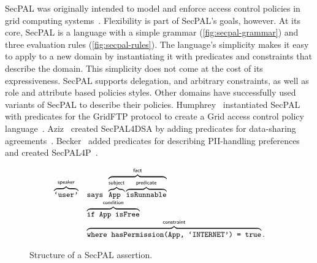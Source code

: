 \documentclass[thesis.tex]{subfiles}
\begin{document}
SecPAL was originally intended to model and enforce access control policies
    in grid computing systems~\cite{becker_secpal:_2010}. Flexibility is part of
    SecPAL's goals, however. At its core, SecPAL is a language with a simple grammar
    (\autoref{fig:secpal-grammar}) and three evaluation rules
    (\autoref{fig:secpal-rules}). The language's simplicity makes it easy to apply
    to a new domain by instantiating it with predicates and constraints that
    describe the domain. This simplicity does not come at the cost of its
    expressiveness. SecPAL supports delegation, and arbitrary constraints, as well
    as role and attribute based policies styles. Other domains have successfully
    used variants of SecPAL to describe their policies. Humphrey~\etal{} instantiated
    SecPAL with predicates for the GridFTP protocol to create a Grid access control
    policy language~\cite{humphrey_fine-grained_2007}. Aziz~\etal{} created SecPAL4DSA
    by adding predicates for data-sharing agreements~\cite{aziz_secpal4dsa:_2011}.
    Becker~\etal{} added predicates for describing \ac{PII}-handling preferences and
    created SecPAL4P~\cite{becker_framework_2009}.

\begin{figure}
  \newcommand{\bracetext}[1]{\text{\sffamily #1}}
  \newcommand{\smalltext}[1]{\text{\ttfamily\small #1}}
  \centering
    \begin{equation*}\small
      \begin{array}{r l}\footnotesize
        \overbrace{\smalltext{`user'}}^{\bracetext{speaker}} &
        \smalltext{ says }\overbrace{\overbrace{\smalltext{ App }}^{\bracetext{subject}}\overbrace{\smalltext{ isRunnable}}^{\bracetext{predicate}}}^{\bracetext{fact}} \\
        & \overbrace{\smalltext{ if App isFree}}^{\bracetext{condition}} \\
        & \overbrace{\smalltext{ where hasPermission(App, `INTERNET') = true}}^{\bracetext{constraint}}.
      \end{array}
    \end{equation*}
  \caption{Structure of a SecPAL assertion.}
  \label{fig:assertion}
\end{figure}
\end{document}
